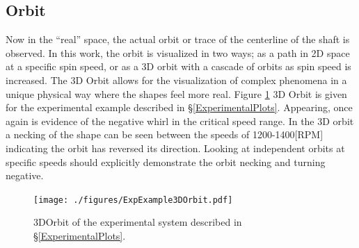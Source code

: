 \subsection{Orbit}
Now in the ``real'' space, the actual orbit or trace of the centerline of the shaft is observed. In this work, the orbit is visualized in two ways; as a path in 2D space at a specific spin speed, or as a 3D orbit with a cascade of orbits as spin speed is increased. The 3D Orbit allows for the visualization of complex phenomena in a unique physical way where the shapes feel more real. Figure \ref{fig:ExpExample3DOrbit} 3D Orbit is given for the experimental example described in \S\ref{ExperimentalPlots}. Appearing, once again is evidence of the negative whirl in the critical speed range. In the 3D orbit a necking of the shape can be seen between the speeds of 1200-1400[RPM] indicating the orbit has reversed its direction. Looking at independent orbits at specific speeds should explicitly demonstrate the orbit necking and turning negative.\par
\begin{figure}
	\centering
	\texttt{[image: ./figures/ExpExample3DOrbit.pdf]}
	\caption{3DOrbit of the experimental system described in \S\ref{ExperimentalPlots}.}
	\label{fig:ExpExample3DOrbit}
\end{figure}
